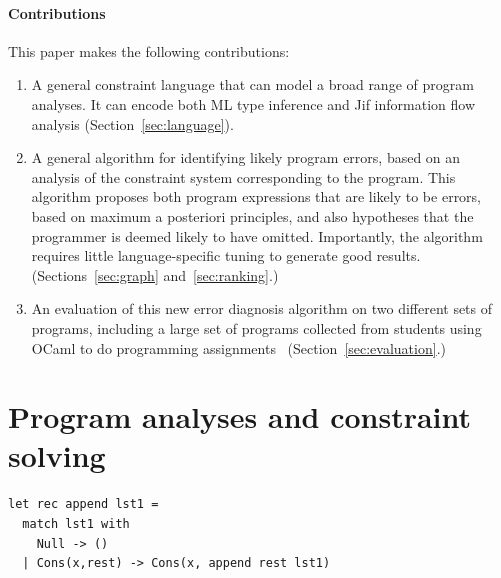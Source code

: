 \paragraph{Contributions}

This paper makes the following contributions:

\begin{enumerate}
\item
A general constraint language that can model a broad
range of program analyses. It can encode both ML type
inference and Jif information flow analysis
(Section~\ref{sec:language}).

\item
A general algorithm for identifying likely program errors,
based on an analysis of the constraint system corresponding
to the program. This algorithm proposes both program expressions
that are likely to be errors, based on maximum a posteriori
principles, and also hypotheses that the programmer is
deemed likely to have omitted. Importantly, the algorithm
requires little language-specific tuning to generate good results.
(Sections~\ref{sec:graph} and~\ref{sec:ranking}.)

\item
An evaluation of this new error diagnosis algorithm on two
different sets of programs, including a large set of programs
collected from students using OCaml to do
programming assignments~\cite{lerner:pldi07}
(Section~\ref{sec:evaluation}.)

\end{enumerate}

\section{Program analyses and constraint solving}



\lstset{numbers=left, xleftmargin=15pt, framexleftmargin=15pt}
\begin{lstlisting}
let rec append lst1 =
  match lst1 with
    Null -> ()
  | Cons(x,rest) -> Cons(x, append rest lst1)
\end{lstlisting}


